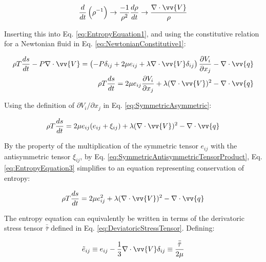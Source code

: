 \documentclass[10pt]{article}
\numberwithin{equation}{section} %
\begin{document}
\begin{equation}
\frac{d}{dt}\left(\rho^{-1}\right)\rightarrow\frac{-1}{\rho^2}\frac{d\rho}{dt}\rightarrow\frac{\nabla\cdot\vv{V}}{\rho}
\end{equation}

Inserting this into Eq. \eqref{eq:EntropyEquation1}, and using the constitutive relation for a Newtonian fluid in Eq. \eqref{eq:NewtonianConstitutive1}:

\begin{equation}
\label{eq:EntropyEquation2}
\begin{aligned}
\rho T\frac{ds}{dt}-P\nabla\cdot\vv{V}=\left(-P\delta_{ij}+2\mu e_{ij}+\lambda\nabla\cdot\vv{V}\delta_{ij}\right)\frac{\partial V_i}{\partial x_j}-\nabla\cdot\vv{q}\\
\rho T\frac{ds}{dt}=2\mu e_{ij}\frac{\partial V_i}{\partial x_j}+\lambda(\nabla\cdot\vv{V})^2-\nabla\cdot\vv{q}\\
\end{aligned}
\end{equation}

Using the definition of \(\partial V_i/\partial x_j\) in Eq. \eqref{eq:SymmetricAsymmetric}:

\begin{equation}
\label{eq:EntropyEquation3}
\begin{aligned}
\rho T\frac{ds}{dt}=2\mu e_{ij}(e_{ij}+\xi_{ij})+\lambda(\nabla\cdot\vv{V})^2-\nabla\cdot\vv{q}\\
\end{aligned}
\end{equation}

By the property of the multiplication of the symmetric tensor \(e_{ij}\) with the antisymmetric tensor \(\xi_{ij}\), by Eq. \eqref{eq:SymmetricAntisymmetricTensorProduct}, Eq. \eqref{eq:EntropyEquation3} simplifies to an equation representing conservation of entropy:

\begin{equation}
\label{eq:EntropyEquation4}
\rho T\frac{ds}{dt}=2\mu e_{ij}^2+\lambda(\nabla\cdot\vv{V})^2-\nabla\cdot\vv{q}\\
\end{equation}

The entropy equation can equivalently be written in terms of the derivatoric stress tensor \(\bar{\bar{\tau}}\) defined in Eq. \eqref{eq:DeviatoricStressTensor}. Defining:

\begin{equation}
\label{eq:DeviatoricStressTensorv2}
\tilde{e}_{ij}\equiv e_{ij}-\frac{1}{3}\nabla\cdot\vv{V}\delta_{ij}\equiv\frac{\bar{\bar{\tau}}}{2\mu}
\end{equation}
\end{document}
